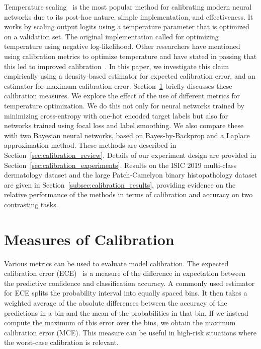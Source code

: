 Temperature scaling~\citep{guo2017calibration} is the most popular method for calibrating modern neural networks due to its post-hoc nature, simple implementation, and effectiveness. It works by scaling output logits using a temperature parameter that is optimized on a validation set. The original implementation called for optimizing temperature using negative log-likelihood. Other researchers have mentioned using calibration metrics to optimize temperature and have stated in passing that this led to improved calibration~\citep{mukhoti2020calibrating,frenkel2021network}. In this paper, we investigate this claim empirically using a density-based estimator for expected calibration error, and an estimator for maximum calibration error. Section~\ref{sec:calibration_measures} briefly discusses these calibration measures. We explore the effect of the use of different metrics for temperature optimization. We do this not only for neural networks trained by minimizing cross-entropy with one-hot encoded target labels but also for networks trained using focal loss and label smoothing. We also compare these with two Bayesian neural networks, based on Bayes-by-Backprop and a Laplace approximation method. These methods are described in Section~\ref{sec:calibration_review}. Details of our experiment design are provided in Section~\ref{sec:calibration_experiments}. Results on the ISIC 2019 multi-class dermatology dataset and the large Patch-Camelyon binary histopathology dataset are given in Section~\ref{subsec:calibration_results}, providing evidence on the relative performance of the methods in terms of calibration and accuracy on two contrasting tasks.



\section{Measures of Calibration}
\label{sec:calibration_measures}
Various metrics can be used to evaluate model calibration. The expected calibration error (ECE)~\citep{guo2017calibration} is a measure of the difference in expectation between the predictive confidence and classification accuracy. A commonly used estimator for ECE splits the probability interval into equally spaced bins. It then takes a weighted average of the absolute differences between the accuracy of the predictions in a bin and the mean of the probabilities in that bin. If we instead compute the maximum of this error over the bins, we obtain the maximum calibration error (MCE). This measure can be useful in high-risk situations where the worst-case calibration is relevant. 


